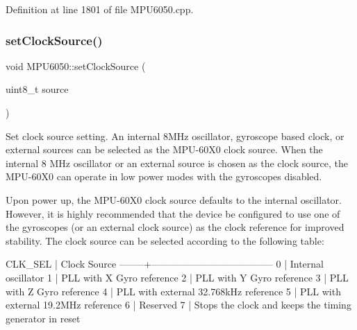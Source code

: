 Definition at line 1801 of file M\+P\+U6050.\+cpp.


\begin{DoxyCode}{0}

\end{DoxyCode}
\mbox{\label{classMPU6050_a4c1cd147d038e024bdeaa053c4d77734}} 
\subsubsection{\texorpdfstring{setClockSource()}{setClockSource()}}
{\footnotesize\ttfamily void M\+P\+U6050\+::set\+Clock\+Source (\begin{DoxyParamCaption}\item[{uint8\+\_\+t}]{source }\end{DoxyParamCaption})}

Set clock source setting. An internal 8M\+Hz oscillator, gyroscope based clock, or external sources can be selected as the M\+P\+U-\/60\+X0 clock source. When the internal 8 M\+Hz oscillator or an external source is chosen as the clock source, the M\+P\+U-\/60\+X0 can operate in low power modes with the gyroscopes disabled.

Upon power up, the M\+P\+U-\/60\+X0 clock source defaults to the internal oscillator. However, it is highly recommended that the device be configured to use one of the gyroscopes (or an external clock source) as the clock reference for improved stability. The clock source can be selected according to the following table\+:


\begin{DoxyPre}
CLK\_SEL | Clock Source
--------+--------------------------------------
0       | Internal oscillator
1       | PLL with X Gyro reference
2       | PLL with Y Gyro reference
3       | PLL with Z Gyro reference
4       | PLL with external 32.768kHz reference
5       | PLL with external 19.2MHz reference
6       | Reserved
7       | Stops the clock and keeps the timing generator in reset
\end{DoxyPre}



